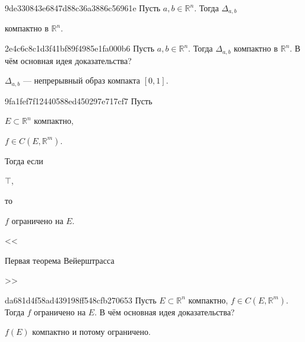 \begin{note}{9de330843e6847d88c36a3886c56961e}
    Пусть \({ a, b \in \mathbb R^{n} }\). Тогда \({ \Delta_{a, b} }\) \begin{icloze}{1}компактно в \({ \mathbb R^{n} }\).\end{icloze}
\end{note}

\begin{note}{2e4c6c8c1d3f41bf89f4985e1fa000b6}
    Пусть \({ a, b \in \mathbb R^{n} }\). Тогда \({ \Delta_{a, b} }\) компактно в \({ \mathbb R^{n} }\).
    В чём основная идея доказательства?

    \begin{cloze}{1}
        \({ \Delta_{a, b} }\) --- непрерывный образ компакта \({ [0, 1] }\).
    \end{cloze}
\end{note}

\begin{note}{9fa1fef7f12440588ed450297e717cf7}
    Пусть \begin{icloze}{3}\({ E \subset \mathbb R^{n} }\) компактно,\end{icloze}\: \begin{icloze}{4}\({ f \in C(E, \mathbb R^{m}) }\).\end{icloze}
    Тогда если \begin{icloze}{2}\({ \top }\),\end{icloze} то \begin{icloze}{1}\({ f }\) ограничено на \({ E }\).\end{icloze}

    \begin{center}
        \tiny
        <<\begin{icloze}{5}Первая теорема Вейерштрасса\end{icloze}>>
    \end{center}
\end{note}

\begin{note}{da681d4f58ad439198ff548cfb270653}
    Пусть \({ E \subset \mathbb R^{n} }\) компактно,\: \({ f \in C(E, \mathbb R^{m}) }\).
    Тогда \({ f }\) ограничено на \({ E }\).
    В чём основная идея доказательства?

    \begin{cloze}{1}
        \({ f(E) }\) компактно и потому ограничено.
    \end{cloze}
\end{note}

